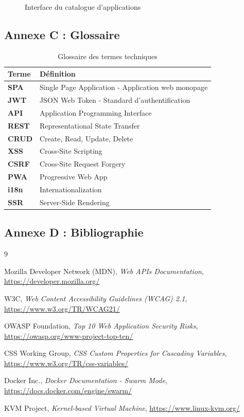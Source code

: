 \documentclass[12pt,a4paper]{article}
\begin{document}
\begin{figure}[H]
\centering
{}
\caption{Interface du catalogue d'applications}
\end{figure}

\subsection{Annexe C : Glossaire}

\begin{table}[H]
\centering
\begin{tabular}{>{\bfseries}l p{10cm}}
\toprule
Terme & Définition \\
\midrule
SPA & Single Page Application - Application web monopage \\
JWT & JSON Web Token - Standard d'authentification \\
API & Application Programming Interface \\
REST & Representational State Transfer \\
CRUD & Create, Read, Update, Delete \\
XSS & Cross-Site Scripting \\
CSRF & Cross-Site Request Forgery \\
PWA & Progressive Web App \\
i18n & Internationalization \\
SSR & Server-Side Rendering \\
\bottomrule
\end{tabular}
\caption{Glossaire des termes techniques}
\end{table}

\subsection{Annexe D : Bibliographie}

\begin{thebibliography}{9}

Mozilla Developer Network (MDN),
\textit{Web APIs Documentation},
\url{https://developer.mozilla.org/}

W3C,
\textit{Web Content Accessibility Guidelines (WCAG) 2.1},
\url{https://www.w3.org/TR/WCAG21/}

OWASP Foundation,
\textit{Top 10 Web Application Security Risks},
\url{https://owasp.org/www-project-top-ten/}

CSS Working Group,
\textit{CSS Custom Properties for Cascading Variables},
\url{https://www.w3.org/TR/css-variables/}

Docker Inc.,
\textit{Docker Documentation - Swarm Mode},
\url{https://docs.docker.com/engine/swarm/}

KVM Project,
\textit{Kernel-based Virtual Machine},
\url{https://www.linux-kvm.org/}

\end{thebibliography}
\end{document}
